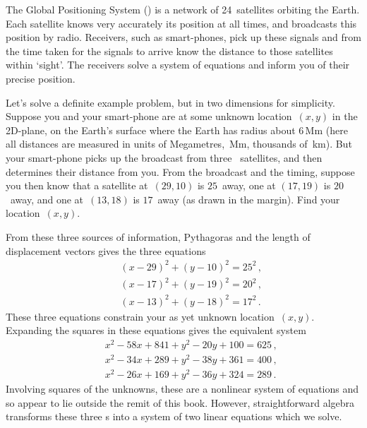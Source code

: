 \begin{example} \label{eg:gps2}
The Global Positioning System (\gps) is a network of 24~satellites orbiting the Earth.
Each satellite knows very accurately its position at all times, and broadcasts this position by radio.
Receivers, such as smart-phones, pick up these signals and from the time taken for the signals to arrive know the distance to those satellites within `sight'.
The receivers solve a system of equations and inform you of their precise position.

Let's solve a definite example problem, but in two dimensions for simplicity.
Suppose you and your smart-phone are at some unknown location~\((x,y)\) in the 2D-plane, on the Earth's surface where the Earth has radius about \(6\)\,Mm (here all distances are measured in units of Megametres,~Mm, thousands of~km).
But your smart-phone picks up the broadcast from three \gps\ satellites, and then determines their distance from you.
%
From the broadcast and the timing, suppose you then know that a satellite at~\((29,10)\) is \(25\)~away, one at \((17,19)\) is \(20\)~away, and one at~\((13,18)\) is \(17\)~away (as drawn in the margin).
Find your location~\((x,y)\).


\begin{solution} 
From these three sources of information, Pythagoras and the length of displacement vectors gives the three equations
\begin{eqnarray*}
&&(x-29)^2+(y-10)^2=25^2\,,
\\&&(x-17)^2+(y-19)^2=20^2\,,
\\&&(x-13)^2+(y-18)^2=17^2\,.
\end{eqnarray*}
These three equations constrain your as yet unknown location~\((x,y)\).
Expanding the squares in these equations gives the equivalent system
\begin{eqnarray*}
&&x^2-58x+841+y^2-20y+100=625\,,
\\&&x^2-34x+289+y^2-38y+361=400\,,
\\&&x^2-26x+169+y^2-36y+324=289\,.
\end{eqnarray*}
Involving squares of the unknowns, these are a nonlinear system of equations and so appear to lie outside the remit of this book.  
However, straightforward algebra transforms these three s into a system of two linear equations which we solve.


\end{solution}
\end{example}
